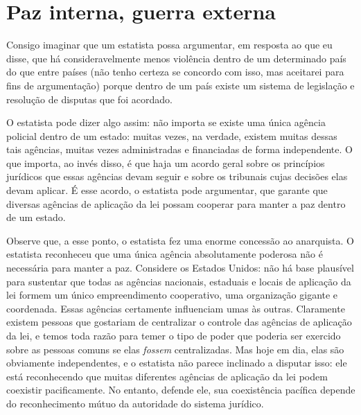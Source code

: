\section{Paz interna, guerra externa}

Consigo imaginar que um estatista possa argumentar, em resposta ao que eu disse, que há consideravelmente menos violência dentro de um determinado país do que entre países (não tenho certeza se concordo com isso, mas aceitarei para fins de argumentação) porque dentro de um país existe um sistema de legislação e resolução de disputas que foi acordado.

O estatista pode dizer algo assim: não importa se existe uma única agência policial dentro de um estado: muitas vezes, na verdade, existem muitas dessas tais agências, muitas vezes administradas e financiadas de forma independente. O que importa, ao invés disso, é que haja um acordo geral sobre os princípios jurídicos que essas agências devam seguir e sobre os tribunais cujas decisões elas devam aplicar. É esse acordo, o estatista pode argumentar, que garante que diversas agências de aplicação da lei possam cooperar para manter a paz dentro de um estado.

Observe que, a esse ponto, o estatista fez uma enorme concessão ao anarquista. O estatista reconheceu que uma única agência absolutamente poderosa não é necessária para manter a paz. Considere os Estados Unidos: não há base plausível para sustentar que todas as agências nacionais, estaduais e locais de aplicação da lei formem um único empreendimento cooperativo, uma organização gigante e coordenada. Essas agências certamente influenciam umas às outras. Claramente existem pessoas que gostariam de centralizar o controle das agências de aplicação da lei, e temos toda razão para temer o tipo de poder que poderia ser exercido sobre as pessoas comuns se elas \emph{fossem} centralizadas. Mas hoje em dia, elas são obviamente independentes, e o estatista não parece inclinado a disputar isso: ele está reconhecendo que muitas diferentes agências de aplicação da lei podem coexistir pacificamente. No entanto, defende ele, sua coexistência pacífica depende do reconhecimento mútuo da autoridade do sistema jurídico.

